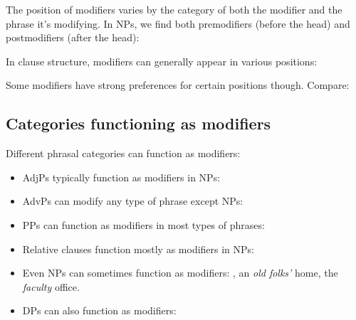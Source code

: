 The position of modifiers varies by the category of both the modifier and the phrase it's modifying. In NPs, we find both premodifiers (before the head) and postmodifiers (after the head):

\ea\label{ex:np-modifiers}
   \z
\z
In clause structure, modifiers can generally appear in various positions:

\ea\label{ex:vp-modifiers}
   \z
\z
Some modifiers have strong preferences for certain positions though. Compare:

\ea\label{ex:modifier-position}
   \z
\z{}

\subsection{Categories functioning as modifiers}

Different phrasal categories can function as modifiers:

\begin{itemize}[noitemsep]
   \item AdjPs typically function as modifiers in NPs: 
   \item AdvPs can modify any type of phrase except NPs: 
   \item PPs can function as modifiers in most types of phrases: 
   \item Relative clauses function mostly as modifiers in NPs: 
   \item Even NPs can sometimes function as modifiers: , an \emph{old folks'} home, the \emph{faculty} office.
   \item DPs can also function as modifiers: 
\end{itemize}

